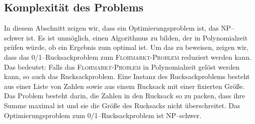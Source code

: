 \subsection{Komplexität des Problems}\label{sec:komplexitaet}





In diesem Abschnitt zeigen wir, dass \fp{} ein Optimierungsproblem ist, das NP--schwer ist.
Es ist unmöglich, einen Algorithmus zu bilden, der in Polynomialzeit prüfen würde,
ob ein Ergebnis zum \fp{} optimal ist. 
Um das zu beweisen, zeigen wir, dass das
0/1--Rucksackproblem zum \textsc{Floh\-markt-\-Pro\-blem} reduziert werden kann.
Das bedeutet: Falls das \textsc{Floh\-markt-\-Pro\-blem} in Polynomialzeit gelöst werden kann,
so auch das Rucksackproblem.
Eine Instanz des Rucksackproblems besteht aus einer Liste von Zahlen
sowie aus einem Rucksack mit einer fixierten Größe.
Das Problem besteht darin, die Zahlen in den Rucksack 
so zu packen, dass ihre Summe maximal ist und sie die Größe des Rucksacks nicht überschreitet.
Das Optimierungsproblem zum 0/1--Rucksackproblem ist NP--schwer.\cite{garey_johnson_2009}


